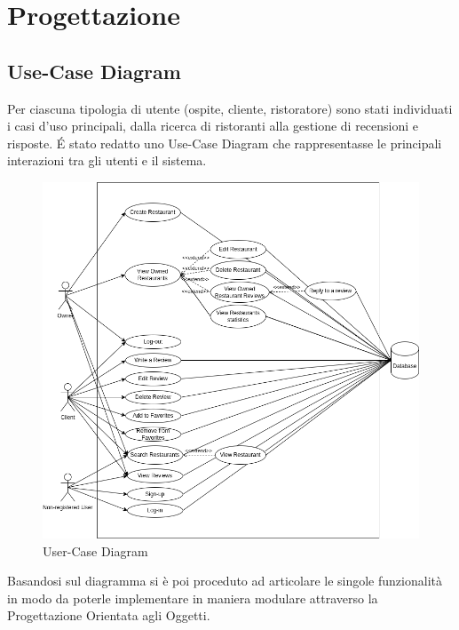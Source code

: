 \section{Progettazione}

\subsection{Use-Case Diagram}
Per ciascuna tipologia di utente (ospite, cliente, ristoratore) sono stati individuati 
i casi d'uso principali, dalla ricerca di ristoranti alla gestione 
di recensioni e risposte.
\'E stato redatto uno Use-Case Diagram che rappresentasse le 
principali interazioni tra gli utenti e il sistema.
\begin{figure}[H]
  \centering
  \includegraphics[width=\textwidth]{images/UML-Use-Case.png}
  \caption{User-Case Diagram}
  \label{fig:use-case-diagram}
\end{figure}
Basandosi sul diagramma si è poi proceduto ad articolare le 
singole funzionalità in modo da poterle implementare
in maniera modulare attraverso la Progettazione Orientata agli Oggetti.

